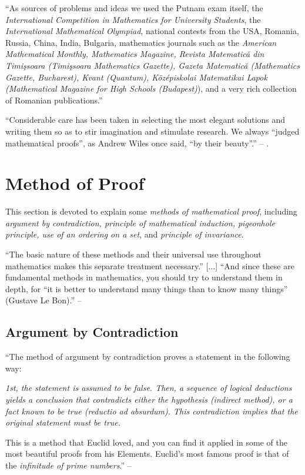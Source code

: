 \documentclass[oneside]{book}
\numberwithin{equation}{section}
\begin{document}
``As sources of problems and ideas we used the Putnam exam itself, the \textit{International Competition in Mathematics for University Students}, the \textit{International Mathematical Olympiad}, national contests from the USA, Romania, Russia, China, India, Bulgaria, mathematics journals such as the \textit{American Mathematical Monthly, Mathematics Magazine, Revista Matematică din Timişsoara (Timişsoara Mathematics Gazette), Gazeta Matematică (Mathematics Gazette, Bucharest), Kvant (Quantum), Középiskolai Matematikai Lapok (Mathematical Magazine for High Schools (Budapest)}), and a very rich collection of Romanian publications.''

``Considerable care has been taken in selecting the most elegant solutions and writing them so as to stir imagination and stimulate research. We always ``judged mathematical proofs'', as Andrew Wiles once said, ``by their beauty''.'' -- \cite[Preface to the 1st Edition, p. ix]{Gelca_Andreescu2017}.

\section{Method of Proof}
This section is devoted to explain some \textit{methods of mathematical proof}, including \textit{argument by contradiction,  principle of mathematical induction, pigeonhole principle, use of an ordering on a set}, and \textit{principle of invariance}.

``The basic nature of these methods and their universal use throughout mathematics makes this separate treatment necessary.'' [$\ldots$] ``And since these are fundamental methods in mathematics, you should try to understand them in depth, for ``it is better to understand many things than to know many
things'' (Gustave Le Bon).'' -- \cite[Chap. 1, p. 1]{Gelca_Andreescu2017}

\subsection{Argument by Contradiction}
``The method of argument by contradiction proves a statement in the following way:
\begin{tcolorbox}
	\textit{1st, the statement is assumed to be false. Then, a sequence of logical deductions yields a conclusion that contradicts either the hypothesis (indirect method), or a fact known to be true (reductio ad absurdum). This contradiction implies that the original statement must be true.}
\end{tcolorbox}
This is a method that Euclid loved, and you can find it applied in some of the most beautiful proofs from his Elements. Euclid's most famous proof is that of the \textit{infinitude of prime numbers}.'' -- \cite[Sect. 1.1, p. 1]{Gelca_Andreescu2017}
\end{document}
